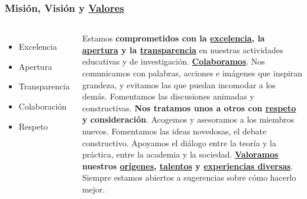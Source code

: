 \begin{frame}[fragile]
\frametitle{Misión, Visión y \underline{Valores}}
\begin{columns}[c] %


\begin{itemize}
\item Excelencia
\item Apertura
\item Transparencia
\item Colaboración
\item Respeto
\end{itemize}

Estamos {\bf \color{LCredInst}comprometidos con la \underline{excelencia}, la \underline{apertura} y la \underline{transparencia}} en nuestras actividades educativas y de investigación. {\bf \color{LCblueInst}\underline{Colaboramos}}. Nos comunicamos con palabras, acciones e imágenes que inspiran grandeza, y evitamos las que puedan incomodar a los demás. Fomentamos las discusiones animadas y constructivas. {\bf \color{LCblueSec1}Nos tratamos unos a otros con \underline{respeto} y consideración}.  Acogemos y asesoramos a los miembros nuevos. Fomentamos las ideas novedosas, el debate constructivo. Apoyamos el diálogo entre la teoría y la práctica, entre la academia y la sociedad. {\bf \color{LCblueSec2}\underline{Valoramos} nuestros \underline{orígenes}, \underline{talentos} y \underline{experiencias diversas}}. Siempre estamos abiertos a sugerencias sobre cómo hacerlo mejor.
\end{columns}

\end{frame}